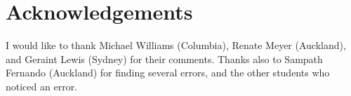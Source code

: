 \chapter{Acknowledgements}
I would like to thank Michael Williams (Columbia),
Renate Meyer (Auckland), and Geraint Lewis (Sydney) for their comments.
Thanks also to Sampath Fernando (Auckland) for finding several errors, and
the other students who noticed an error.

